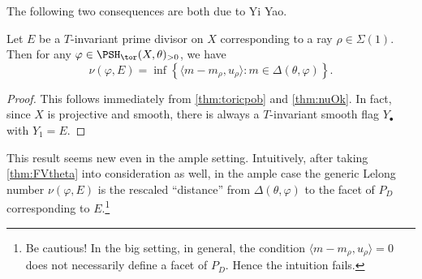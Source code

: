 The following two consequences are both due to Yi Yao.
\begin{corollary}\label{cor:toricLelong}
    Let $E$ be a $T$-invariant prime divisor on $X$ corresponding to a ray $\rho\in \Sigma(1)$. Then for any $\varphi\in \PSH_{\tor}(X,\theta)_{>0}$, we have
    \[
    \nu(\varphi,E)=\inf \left\{ \langle m-m_{\rho},u_{\rho}\rangle : m\in \Delta(\theta,\varphi) \right\}.
    \]
\end{corollary}
\begin{proof}
    This follows immediately from \cref{thm:toricpob} and \cref{thm:nuOk}. In fact, since $X$ is projective and smooth, there is always a $T$-invariant smooth flag $Y_{\bullet}$ with $Y_1=E$.
\end{proof}
This result seems new even in the ample setting. Intuitively, after taking \cref{thm:FVtheta} into consideration as well, in the ample case the generic Lelong number $\nu(\varphi,E)$ is the rescaled ``distance'' from $\Delta(\theta,\varphi)$ to the facet of $P_D$ corresponding to $E$.\footnote{Be cautious! In the big setting, in general, the condition $\langle m-m_{\rho},u_{\rho}\rangle=0$ does not necessarily define a facet of $P_D$. Hence the intuition fails.}

